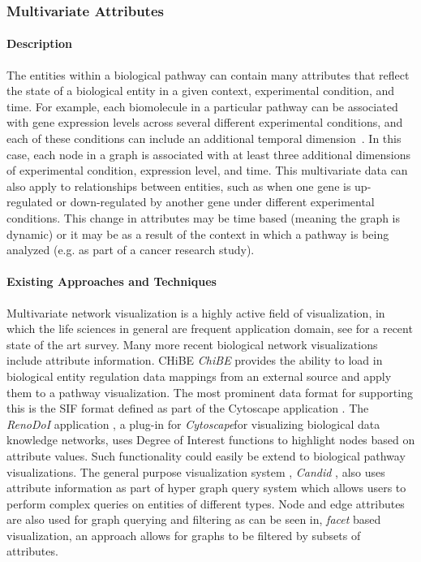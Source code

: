 \subsubsection*{Multivariate Attributes}

\paragraph*{Description}
The entities within a biological pathway can contain many attributes that reflect the state of a biological entity in a given context, experimental condition, and time.
For example, each biomolecule in a particular pathway can be associated with gene expression levels across several different experimental conditions, and each of these conditions can include an additional temporal dimension~\cite{Barsky2008cerebral}.
In this case, each node in a graph is associated with at least three additional dimensions of experimental condition, expression level, and time.
This multivariate data can also apply to relationships between entities, such as when one gene is up-regulated or down-regulated by another gene under different experimental conditions.
This change in attributes may be time based (meaning the graph is dynamic) or it may be as a result of the context in which a pathway is being analyzed (e.g. as part of a cancer research study).


\paragraph*{Existing Approaches and Techniques}
Multivariate network visualization is a highly active field of visualization, in which the life sciences in general are frequent application domain, see \cite{} for a recent state of the art survey.
Many more recent biological network visualizations include attribute information.
CHiBE \textit{ChiBE}\cite{Babur2010chibe} provides the ability to load in biological entity regulation data mappings from an external source and apply them to a pathway visualization.
The most prominent data format for supporting this is the SIF format defined as part of the Cytoscape application \cite{Shannon2003cytoscape}.
The \textit{RenoDoI} application \cite{Vehlow2015}, a plug-in for \textit{Cytoscape}for visualizing biological data knowledge networks, uses Degree of Interest functions to highlight nodes based on attribute values.
Such functionality could easily be extend to biological pathway visualizations.
The general purpose visualization system , \textit{Candid} \cite{Shadoan2013}, also uses attribute information as part of hyper graph query system which allows users to perform complex queries on entities of different types.
Node and edge attributes are also used for graph querying and filtering as can be seen in, \textit{facet} based visualization, an approach allows for graphs to be filtered by subsets of attributes.

